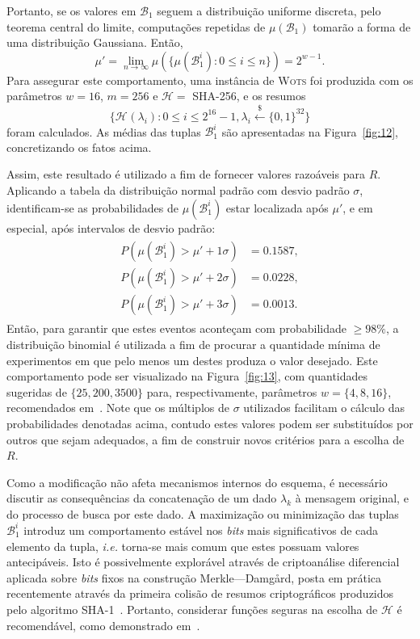 \documentclass{ufsctex/ufsctex}
\newcommand{\hh}{\mathcal{H}}
\newcommand{\bone}{\mathcal{B}_{1}}
\newcommand{\hash}[2][]{\mathcal{H}^{#1} (#2)}
\newcommand{\binwds}[1]{\{0, 1\}^{#1}}
\newcommand{\random}{\stackrel{\$}{\longleftarrow}}
\newcommand{\wots}{\textsc{Wots}}
\begin{document}
Portanto, se os valores em $\bone{}$ seguem a distribuição uniforme discreta,
pelo teorema central do limite, computações repetidas de $\mu(\bone{})$ tomarão
a forma de uma distribuição Gaussiana. Então,
\begin{equation}
  \mu' = \lim_{n \to \infty}
    \mu(\{\mu(\bone^{i}) : 0 \leq i \leq n\}) = 2^{w - 1}.
\end{equation}
Para assegurar este comportamento, uma instância de \wots{} foi produzida com
os parâmetros $w = 16$, $m = 256$ e $\hh{} =$ SHA-256, e os resumos
\begin{equation}
  \{\hash{\lambda_{i}} : 0 \leq i \leq 2^{16} - 1, \lambda_{i}
    \random{} \binwds{32}\}
\end{equation}
foram calculados. As médias das tuplas $\bone^{i}$ são apresentadas na
Figura~\ref{fig:12}, concretizando os fatos acima.

Assim, este resultado é utilizado a fim de fornecer valores razoáveis para $R$.
Aplicando a tabela da distribuição normal padrão com desvio padrão $\sigma$,
identificam-se as probabilidades de $\mu(\bone^{i})$ estar localizada após
$\mu'$, e em especial, após intervalos de desvio padrão:
\begin{align}
  \begin{split}
    P(\mu(\bone^{i}) > \mu' + 1\sigma) &= 0.1587, \\
    P(\mu(\bone^{i}) > \mu' + 2\sigma) &= 0.0228, \\
    P(\mu(\bone^{i}) > \mu' + 3\sigma) &= 0.0013.
  \end{split}
\end{align}
Então, para garantir que estes eventos aconteçam com probabilidade $\geq 98\%$,
a distribuição binomial é utilizada a fim de procurar a quantidade mínima de
experimentos em que pelo menos um destes produza o valor desejado. Este
comportamento pode ser visualizado na Figura~\ref{fig:13}, com quantidades
sugeridas de $\{25, 200, 3500\}$ para, respectivamente, parâmetros $w = \{4, 8,
16\}$, recomendados em~\cite[Capítulo 6]{Huelsing:report:2018:may}. Note que
os múltiplos de $\sigma$ utilizados facilitam o cálculo das probabilidades
denotadas acima, contudo estes valores podem ser substituídos por outros
que sejam adequados, a fim de construir novos critérios para a escolha de $R$.

Como a modificação não afeta mecanismos internos do esquema, é necessário
discutir as consequências da concatenação de um dado $\lambda_{k}$ à mensagem
original, e do processo de busca por este dado. A maximização ou minimização
das tuplas $\bone^{i}$ introduz um comportamento estável nos \emph{bits} mais
significativos de cada elemento da tupla, \emph{i.e.} torna-se mais comum que
estes possuam valores antecipáveis. Isto é possivelmente explorável através de
criptoanálise diferencial aplicada sobre \emph{bits} fixos na construção
Merkle---Damgård, posta em prática recentemente através da primeira colisão de
resumos criptográficos produzidos pelo algoritmo
SHA-1~\cite{Stevens:inproc:2017:jul}. Portanto, considerar funções seguras na
escolha de $\hh{}$ é recomendável, como demonstrado em~\cite[Seção
3.2]{Huelsing:inproc:2013:jun}.
\end{document}
